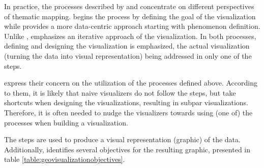 In practice, the processes described by \citeauthor{schlichtmann_visualization_2002} and \citeauthor{slocum_thematic_2014} concentrate on different perspectives of thematic mapping. \citeauthor{schlichtmann_visualization_2002} begins the process by defining the goal of the visualization while \citeauthor{slocum_thematic_2014} provides a more data-centric approach starting with phenomenon definition. Unlike \citeauthor{schlichtmann_visualization_2002}, \citeauthor{slocum_thematic_2014} emphasizes an iterative approach of the visualization. In both processes, defining and designing the visualization is emphasized, the actual visualization (turning the data into visual representation) being addressed in only one of the steps.

\citet[chap.~1]{slocum_thematic_2014} express their concern on the utilization of the processes defined above. According to them, it is likely that naive visualizers do not follow the steps, but take shortcuts when designing the visualizations, resulting in subpar visualizations. Therefore, it is often needed to nudge the visualizers towards using (one of) the processes when building a visualization.

The steps are used to produce a visual representation (graphic) of the data. Additionally, \citet{schlichtmann_visualization_2002} identifies several objectives for the resulting graphic, presented in table \ref{table:geovisualizationobjectives}.

